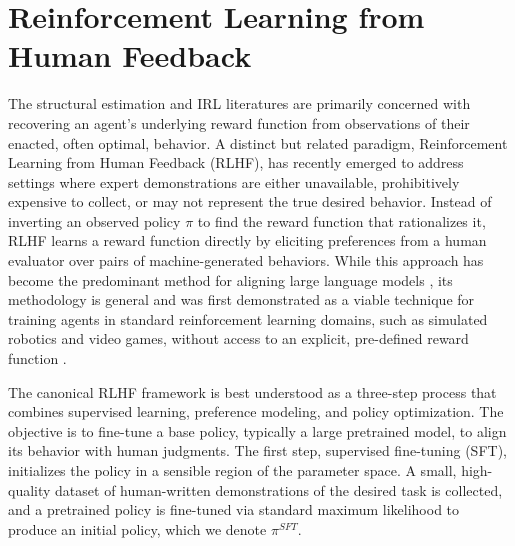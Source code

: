 \section{Reinforcement Learning from Human Feedback}
\label{sec:rlhf}

The structural estimation and IRL literatures are primarily concerned with recovering an agent's underlying reward function from observations of their enacted, often optimal, behavior. A distinct but related paradigm, Reinforcement Learning from Human Feedback (RLHF), has recently emerged to address settings where expert demonstrations are either unavailable, prohibitively expensive to collect, or may not represent the true desired behavior. Instead of inverting an observed policy $\pi$ to find the reward function that rationalizes it, RLHF learns a reward function directly by eliciting preferences from a human evaluator over pairs of machine-generated behaviors. While this approach has become the predominant method for aligning large language models \citep{ouyang2022training}, its methodology is general and was first demonstrated as a viable technique for training agents in standard reinforcement learning domains, such as simulated robotics and video games, without access to an explicit, pre-defined reward function \citep{christiano:2017}.

The canonical RLHF framework is best understood as a three-step process that combines supervised learning, preference modeling, and policy optimization. The objective is to fine-tune a base policy, typically a large pretrained model, to align its behavior with human judgments. The first step, supervised fine-tuning (SFT), initializes the policy in a sensible region of the parameter space. A small, high-quality dataset of human-written demonstrations of the desired task is collected, and a pretrained policy is fine-tuned via standard maximum likelihood to produce an initial policy, which we denote $\pi^{SFT}$.

